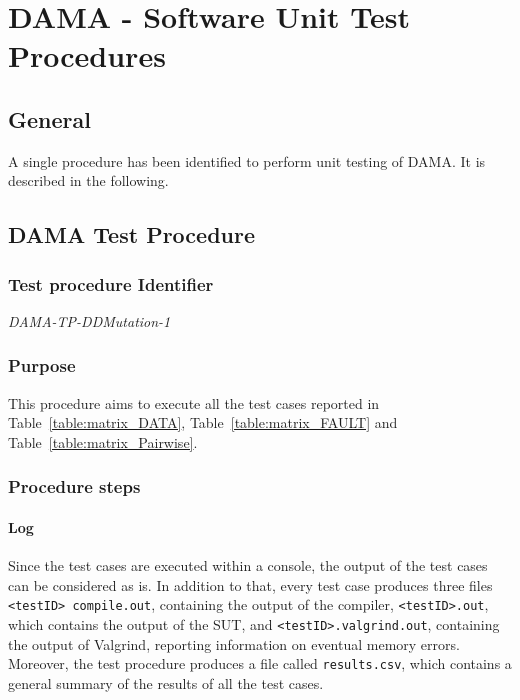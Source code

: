 
\chapter{DAMA - Software Unit Test Procedures}
\label{chap:proc_DAMA}

\section{General}

A single procedure has been identified to perform unit testing of DAMA. It is described in the following.

\section{DAMA Test Procedure}

\subsection{Test procedure Identifier}

\emph{DAMA-TP-DDMutation-1}


\subsection{Purpose}

This procedure aims to execute all the test cases reported in Table~\ref{table:matrix_DATA}, Table~\ref{table:matrix_FAULT} and Table~\ref{table:matrix_Pairwise}.

\subsection{Procedure steps}

\subsubsection{Log}
Since the test cases are executed within a console, the output of the test cases can be considered as is.
In addition to that, every test case produces three files \texttt{<testID> compile.out}, containing the output of the compiler, \texttt{<testID>.out}, which contains the output of the SUT, and \texttt{<testID>.valgrind.out}, containing the output of Valgrind, reporting information on eventual memory errors.
Moreover, the test procedure produces a file called \texttt{results.csv}, which contains a general summary of the results of all the test cases.

